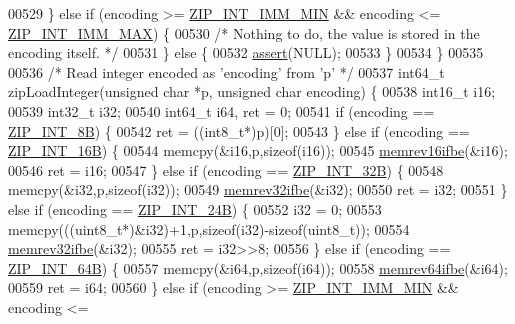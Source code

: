 \begin{DoxyCode}
{{00529     \} \textcolor{keywordflow}{else} \textcolor{keywordflow}{if} (encoding >= \hyperlink{ziplist_8c_af5120069edca0811f31d130674a0de47}{ZIP\_INT\_IMM\_MIN} && encoding <= 
      \hyperlink{ziplist_8c_a69ea30cd75038067a13d2151a1c741ad}{ZIP\_INT\_IMM\_MAX}) \{
00530         \textcolor{comment}{/* Nothing to do, the value is stored in the encoding itself. */}
00531     \} \textcolor{keywordflow}{else} \{
00532         \hyperlink{redisassert_8h_a993abaa2c168852c1592879472938781}{assert}(NULL);
00533     \}
00534 \}
00535 
00536 \textcolor{comment}{/* Read integer encoded as 'encoding' from 'p' */}
00537 int64\_t zipLoadInteger(\textcolor{keywordtype}{unsigned} \textcolor{keywordtype}{char} *p, \textcolor{keywordtype}{unsigned} \textcolor{keywordtype}{char} encoding) \{
00538     int16\_t i16;
00539     int32\_t i32;
00540     int64\_t i64, ret = 0;
00541     \textcolor{keywordflow}{if} (encoding == \hyperlink{ziplist_8c_a0c6338e8866d85135cfc7c340b2c213c}{ZIP\_INT\_8B}) \{
00542         ret = ((int8\_t*)p)[0];
00543     \} \textcolor{keywordflow}{else} \textcolor{keywordflow}{if} (encoding == \hyperlink{ziplist_8c_a57e9bc0aacf9f30d8b76566e40c31a6b}{ZIP\_INT\_16B}) \{
00544         memcpy(&i16,p,\textcolor{keyword}{sizeof}(i16));
00545         \hyperlink{endianconv_8h_a49372891e83ab7a970f0d98dda1870d9}{memrev16ifbe}(&i16);
00546         ret = i16;
00547     \} \textcolor{keywordflow}{else} \textcolor{keywordflow}{if} (encoding == \hyperlink{ziplist_8c_addebc046cc76d482d22d7b4bf90a0649}{ZIP\_INT\_32B}) \{
00548         memcpy(&i32,p,\textcolor{keyword}{sizeof}(i32));
00549         \hyperlink{endianconv_8h_a771f3656eb7d11a1e7f7294b657d8978}{memrev32ifbe}(&i32);
00550         ret = i32;
00551     \} \textcolor{keywordflow}{else} \textcolor{keywordflow}{if} (encoding == \hyperlink{ziplist_8c_a74a906bccde7afa94f1068634a637152}{ZIP\_INT\_24B}) \{
00552         i32 = 0;
00553         memcpy(((uint8\_t*)&i32)+1,p,\textcolor{keyword}{sizeof}(i32)-\textcolor{keyword}{sizeof}(uint8\_t));
00554         \hyperlink{endianconv_8h_a771f3656eb7d11a1e7f7294b657d8978}{memrev32ifbe}(&i32);
00555         ret = i32>>8;
00556     \} \textcolor{keywordflow}{else} \textcolor{keywordflow}{if} (encoding == \hyperlink{ziplist_8c_a1f551b3ab3a4d79190f367e59d6dab0a}{ZIP\_INT\_64B}) \{
00557         memcpy(&i64,p,\textcolor{keyword}{sizeof}(i64));
00558         \hyperlink{endianconv_8h_aa311b9f944c3b988f3601698a95890c1}{memrev64ifbe}(&i64);
00559         ret = i64;
00560     \} \textcolor{keywordflow}{else} \textcolor{keywordflow}{if} (encoding >= \hyperlink{ziplist_8c_af5120069edca0811f31d130674a0de47}{ZIP\_INT\_IMM\_MIN} && encoding <= 
}}
\end{DoxyCode}
